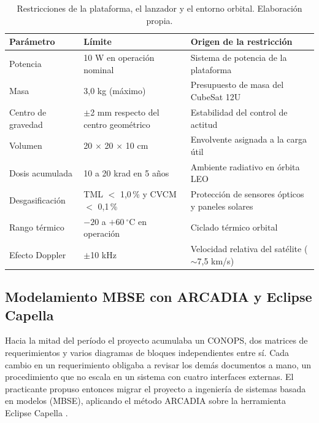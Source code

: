 \begin{table}[H]
\centering
\begin{threeparttable}
\caption{Restricciones de la plataforma, el lanzador y el entorno orbital. Elaboración propia.\vspace{1ex}}
\label{tab:restricciones}
\small
\begin{tabularx}{\textwidth}{|@{\hspace{4pt}}l l X@{\hspace{4pt}}|}
\toprule
\textbf{Parámetro} & \textbf{Límite} & \textbf{Origen de la restricción} \\
\midrule
Potencia            & 10 W en operación nominal & Sistema de potencia de la plataforma \\
Masa                & 3,0 kg (máximo)           & Presupuesto de masa del CubeSat 12U \\
Centro de gravedad  & $\pm$2 mm respecto del centro geométrico & Estabilidad del control de actitud \\
Volumen             & 20 $\times$ 20 $\times$ 10 cm & Envolvente asignada a la carga útil \\
Dosis acumulada     & 10 a 20 krad en 5 años    & Ambiente radiativo en órbita LEO \\
Desgasificación     & TML $<$ 1,0\,\% y CVCM $<$ 0,1\,\% & Protección de sensores ópticos y paneles solares \\
Rango térmico       & $-20$ a $+60\ ^{\circ}$C en operación & Ciclado térmico orbital \\
Efecto Doppler      & $\pm$10 kHz                & Velocidad relativa del satélite ($\sim$7,5 km/s) \\
\bottomrule
\end{tabularx}
\end{threeparttable}
\end{table}


\subsection{Modelamiento MBSE con ARCADIA y Eclipse Capella}

Hacia la mitad del período el proyecto acumulaba un CONOPS, dos matrices de requerimientos y varios diagramas de bloques independientes entre sí. Cada cambio en un requerimiento obligaba a revisar los demás documentos a mano, un procedimiento que no escala en un sistema con cuatro interfaces externas. El practicante propuso entonces migrar el proyecto a ingeniería de sistemas basada en modelos (MBSE), aplicando el método ARCADIA sobre la herramienta Eclipse Capella \parencite{roques}.


